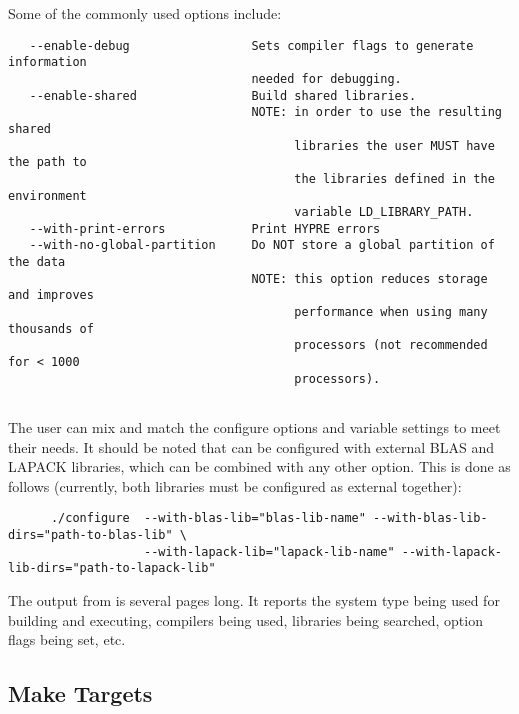 Some of the commonly used options include:

\begin{verbatim}
   --enable-debug                 Sets compiler flags to generate information 
                                  needed for debugging.
   --enable-shared                Build shared libraries.
                                  NOTE: in order to use the resulting shared 
                                        libraries the user MUST have the path to
                                        the libraries defined in the environment 
                                        variable LD_LIBRARY_PATH. 
   --with-print-errors            Print HYPRE errors
   --with-no-global-partition     Do NOT store a global partition of the data
                                  NOTE: this option reduces storage and improves
                                        performance when using many thousands of
                                        processors (not recommended for < 1000 
                                        processors).


\end{verbatim}

The user can mix and match the configure options and variable settings to meet
their needs.  It should be noted that \hypre{} can be configured with external
BLAS and LAPACK libraries, which can be combined with any other option.  This is
done as follows (currently, both libraries must be configured as external
together):

\begin{verbatim}
      ./configure  --with-blas-lib="blas-lib-name" --with-blas-lib-dirs="path-to-blas-lib" \
                   --with-lapack-lib="lapack-lib-name" --with-lapack-lib-dirs="path-to-lapack-lib"
\end{verbatim}

The output from  is several pages long.  It reports the system
type being used for building and executing, compilers being used, libraries
being searched, option flags being set, etc.


\subsection{Make Targets}

